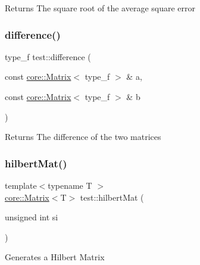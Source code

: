 \begin{DoxyReturn}{Returns}
The square root of the average square error 
\end{DoxyReturn}
\mbox{\label{namespacetest_a5fa6ad5296bb640131d54f53244f8ee0}} 
\subsubsection{\texorpdfstring{difference()}{difference()}}
{\footnotesize\ttfamily type\+\_\+f test\+::difference (\begin{DoxyParamCaption}\item[{const \mbox{\hyperlink{classcore_1_1_matrix}{core\+::\+Matrix}}$<$ type\+\_\+f $>$ \&}]{a,  }\item[{const \mbox{\hyperlink{classcore_1_1_matrix}{core\+::\+Matrix}}$<$ type\+\_\+f $>$ \&}]{b }\end{DoxyParamCaption})}

\begin{DoxyReturn}{Returns}
The difference of the two matrices 
\end{DoxyReturn}
\mbox{\label{namespacetest_aeacee8b5c1a346797ca29db3294b6fc0}} 
\subsubsection{\texorpdfstring{hilbert\+Mat()}{hilbertMat()}}
{\footnotesize\ttfamily template$<$typename T $>$ \\
\mbox{\hyperlink{classcore_1_1_matrix}{core\+::\+Matrix}}$<$T$>$ test\+::hilbert\+Mat (\begin{DoxyParamCaption}\item[{unsigned int}]{si }\end{DoxyParamCaption})}

Generates a Hilbert Matrix 